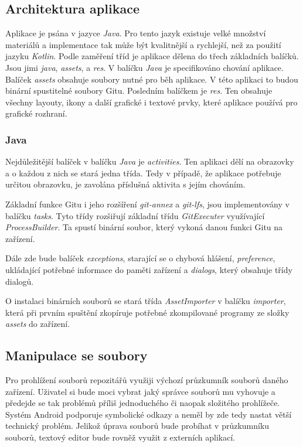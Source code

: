     \subsection{Architektura aplikace}
    Aplikace je psána v jazyce \emph{Java}. Pro tento jazyk existuje velké množství materiálů a implementace tak může být kvalitnější a rychlejší, než za použití jazyku \emph{Kotlin}.
    Podle zaměření tříd je aplikace dělena do třech základních balíčků. Jsou jimi \emph{java}, \emph{assets}, a \emph{res}. V balíčku \emph{Java} je specifikováno chování aplikace. Balíček \emph{assets} obsahuje soubory nutné pro běh aplikace. V této aplikaci to budou binární spustitelné soubory Gitu. Posledním balíčkem je \emph{res}. Ten obsahuje všechny layouty, ikony a další grafické i textové prvky, které aplikace používá pro grafické rozhraní.

        \subsubsection{Java} 
        Nejdůležitější balíček v balíčku \emph{Java} je \emph{activities}. Ten aplikaci dělí na obrazovky a o každou z nich se stará jedna třída. Tedy v případě, že aplikace potřebuje určitou obrazovku, je zavolána příslušná aktivita s jejím chováním.

        Základní funkce Gitu i jeho rozšíření \emph{git-annex} a \emph{git-lfs}, jsou implementovány v balíčku \emph{tasks}. Tyto třídy rozšiřují základní třídu \emph{GitExecuter} využívající \emph{ProcessBuilder}. Ta spustí binární soubor, který vykoná danou funkci Gitu na zařízení.

        Dále zde bude balíček \emph{exceptions}, starající se o chybová hlášení, \emph{preference}, ukládající potřebné informace do paměti zařízení a \emph{dialogs}, který obsahuje třídy dialogů.

        O instalaci binárních souborů se stará třída \emph{AssetImporter} v balíčku \emph{importer}, která při prvním spuštění zkopíruje potřebné zkompilované programy ze složky \emph{assets} do zařízení.

    \subsection{Manipulace se soubory}
    Pro prohlížení souborů repozitářů využiji výchozí průzkumník souborů daného zařízení. Uživatel si bude moci vybrat jaký správce souborů mu vyhovuje a předejde se tak problémů příliš jednoduchého či naopak složitého prohlížeče. Systém Android podporuje symbolické odkazy a neměl by zde tedy nastat větší technický problém.
    Jelikož úprava souborů bude probíhat v průzkumníku souborů, textový editor bude rovněž využit z externích aplikací.

